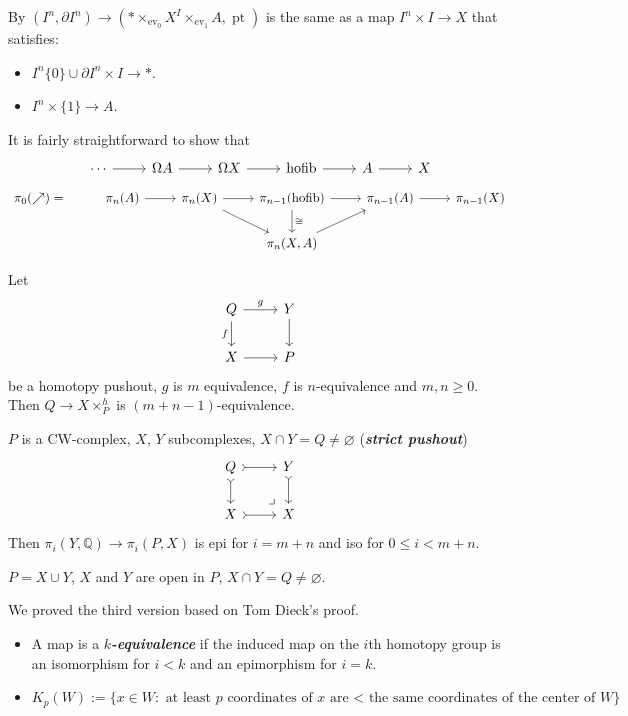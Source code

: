 \documentclass{article}
\numberwithin{equation}{section}
\newcommand{\Q}{\mathbb{Q}}
\DeclareMathOperator{\pt}{pt}
\DeclareMathOperator{\ev}{ev}
\DeclareMathOperator{\hofib}{hofib}
\begin{document}
\begin{defn}
	By $(I^n,\partial I^n)\to (*\times_{\ev_0}X^I\times_{\ev_1}A,\pt)$ is the same as a map $I^n\times I\to X$ that satisfies:
	\begin{itemize}
		\item $I^n\{0\}\cup\partial I^n\times I\to*$.
		\item $I^n\times\{1\}\to A$.
	\end{itemize}
\end{defn}
It is fairly straightforward to show that
\[\begin{tikzcd}
	\cdots\arrow[r]&\Omega A\arrow[r]&\Omega X\arrow[r]&\hofib\arrow[r]&A\arrow[r]&X
\end{tikzcd}\]
\[\begin{tikzcd}
	\pi_0(\nearrow)=&\pi_n(A)\arrow[r]&\pi_n(X)\arrow[r]\arrow[dr]&\pi_{n-1}(\hofib)\arrow[d,"\cong"]\arrow[r]&\pi_{n-1}(A)\arrow[r]&\pi_{n-1}(X)\\
	&&&\pi_n(X,A)\arrow[ur]
\end{tikzcd}\]
\begin{thm}
	Let 
	\[\begin{tikzcd}
		Q\arrow[r,"g"]\arrow[d,swap,"f"]&Y\arrow[d]\\
		X\arrow[r]&P
	\end{tikzcd}\]
	be a homotopy pushout, $g$ is $m$ equivalence, $f$ is $n$-equivalence and $m,n\geq0$. Then $Q\to X\times_P^h$ is $(m+n-1)$-equivalence.
\end{thm}
\begin{thm}
	$P$ is a CW-complex, $X$, $Y$ subcomplexes, $X\cap Y=Q\neq\varnothing$ (\textbf{\textit{strict pushout}})
	\[\begin{tikzcd}
		Q\arrow[r,tail]\arrow[d,tail]&Y\arrow[d,tail]\\
		X\arrow[r,tail]&X\arrow[ul, phantom, "\lrcorner", very near start]
	\end{tikzcd}\]
	Then $\pi_i(Y,\Q)\to\pi_i(P,X)$ is epi for $i=m+n$ and iso for $0\leq i<m+n$.
\end{thm}
\begin{thm}
	$P=X\cup Y$, $X$ and $Y$ are open in $P$, $X\cap Y=Q\neq\varnothing$.
\end{thm}
We proved the third version based on Tom Dieck's proof.
\begin{defn}\leavevmode
	\begin{itemize}
		\item 	A map is a \textbf{\textit{$k$-equivalence}} if the induced map on the $i$th homotopy group is an isomorphism for $i<k$ and an epimorphism for $i=k$.
		\item $K_p(W):=\{x\in W:\text{ at least $p$ coordinates of $x$ are < the same coordinates of the center of }W\}$
	\end{itemize}
\end{defn}
\end{document}
